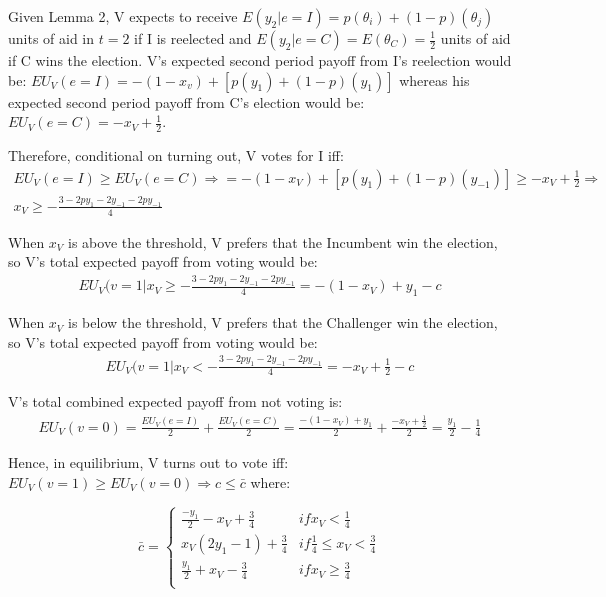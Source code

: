 \documentclass[12pt]{paper}
\begin{document}
Given Lemma 2, V expects to receive $E(y_2 | e=I) = p(\theta_i )+(1-p)(\theta_j)$ units of aid in $t=2$ if I is reelected and $E(y_2 |e=C)=E(\theta_C )=\frac{1}{2}$ units of aid if C wins the election.  V’s expected second period payoff from I’s reelection would be: $EU_V (e=I) = -(1 - x_v ) + [p(y_1 ) + (1 - p)(y_1 )]$ whereas his expected second period payoff from C’s election would be: $EU_V (e=C) = - x_V + \frac{1}{2}$. 

Therefore, conditional on turning out, V votes for I iff: 
\begin{gather}
EU_V (e=I) \geq EU_V (e=C) \Rightarrow = -(1 - x_V ) + [p(y_1 ) + (1 - p)(y_{-1} )] \geq - x_V + \frac{1}{2} \Rightarrow \\
x_V \geq -\frac{3 - 2py_1 - 2y_{-1} - 2py_{-1}}{4}
\end{gather}

When $x_V$ is above the threshold, V prefers that the Incumbent win the election, so V’s total expected payoff from voting would be:
\begin{gather}
 EU_V (v=1 | x_V \geq -\frac{3 - 2py_1 - 2y_{-1} - 2py_{-1}}{4} = - (1 - x_V ) + y_1 - c
\end{gather}

When $x_V$ is below the threshold, V prefers that the Challenger win the election, so V’s total expected payoff from voting would be:
\begin{gather}
 EU_V (v=1 | x_V < -\frac{3 - 2py_1 - 2y_{-1} - 2py_{-1}}{4} = -x_V + \frac{1}{2} - c
\end{gather}

V’s total combined expected payoff from not voting is:
\begin{gather}
EU_V (v=0) = \frac{EU_V (e=I)}{2} + \frac{EU_V (e=C)}{2} = \frac{- (1 - x_V ) + y_1}{2} + \frac{-x_V + \frac{1}{2}}{2} = \frac{y_1}{2} - \frac{1}{4}
\end{gather}

Hence, in equilibrium, V turns out to vote iff: $EU_V (v=1) \geq EU_V (v=0) \Rightarrow c \leq \bar{c}$ where:

\begin{equation}
\bar{c} =
\begin{cases}
\frac{-y_1}{2} - x_V + \frac{3}{4} & if x_V < \frac{1}{4}\\    
x_V (2y_1 - 1) + \frac{3}{4}     & if \frac{1}{4} \leq x_V < \frac{3}{4}  \\
\frac{y_1}{2} + x_V - \frac{3}{4}     & if x_V \geq \frac{3}{4}  \\
\end{cases}
\end{equation}
\end{document}
